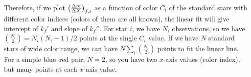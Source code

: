 Therefore, if we plot $ \qty ( \frac{\Delta m }{\Delta X} )_{f, i} $ as a function of color $ C_i $ of the standard stars with different color indices (colors of them are all known), the linear fit will give intercept of $ k_f' $ and slope of $ k_f'' $. For star $ i $, we have $ N_i $ observations, so we have $ \binom{N_i}{2} = N_i (N_i - 1) / 2 $ points at the single $ C_i $ value. If we have $ N $ standard stars of wide color range, we can have $ N \sum_i \binom{N_i}{2} $ points to fit the linear line. For a simple blue--red pair, $ N = 2 $, so you have two $ x $-axis values (color index), but many points at each $ x $-axis value.


